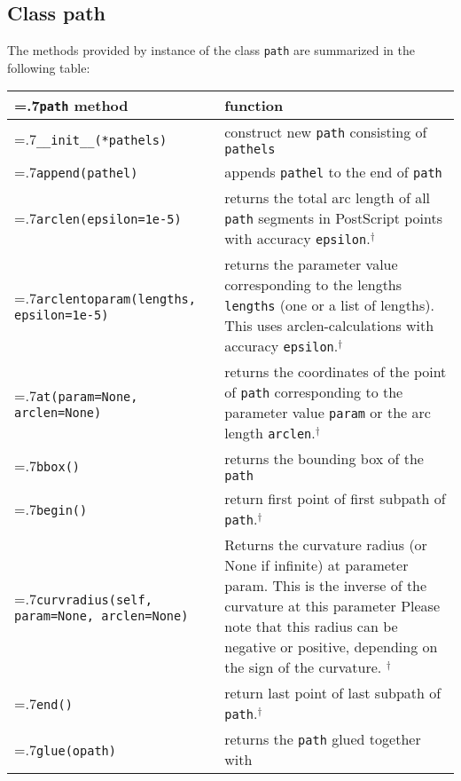 \subsection{Class path}

The methods provided by instance of the class \verb|path| are
summarized in the following table:

\medskip
\begin{tabularx}{1.04\linewidth}{>{\hsize=.7\hsize}X>{\raggedright\arraybackslash\hsize=1.3\hsize}X}
  \texttt{path} method & function \\
  \hline \texttt{\_\_init\_\_(*pathels)} & construct new \texttt{path}
  consisting of \texttt{pathels}\\
  \texttt{append(pathel)} & appends \texttt{pathel} to the end of 
  \texttt{path}\\
  \texttt{arclen(epsilon=1e-5)} & returns the total arc length of
  all \texttt{path} segments in PostScript points with accuracy
  \texttt{epsilon}.$^\dagger$\\
  \texttt{arclentoparam(lengths, \newline\phantom{arclentoparam(}epsilon=1e-5)} & returns the
  parameter value corresponding to the lengths \texttt{lengths} (one or a list of
  lengths). This uses arclen-calculations with accuracy
  \texttt{epsilon}.$^\dagger$\\
  \texttt{at(param=None,
    \newline\phantom{at(}arclen=None)} & returns the coordinates of the point of
  \texttt{path} corresponding to the parameter value
  \texttt{param} or the arc length \verb|arclen|.$^\dagger$\\
  \texttt{bbox()} & returns the bounding box of the \texttt{path}\\
  \texttt{begin()} & return first point of first subpath of
  \texttt{path}.$^\dagger$\\
   \texttt{curvradius(self, 
    \newline\phantom{curvradius(}param=None,
    \newline\phantom{curvradius(}arclen=None)} &
        Returns the curvature radius (or None if infinite) at parameter param.
        This is the inverse of the curvature at this parameter
        Please note that this radius can be negative or positive,
        depending on the sign of the curvature.
        $^\dagger$
        \\
  \texttt{end()} & return last point of last subpath of
  \texttt{path}.$^\dagger$\\
  \texttt{glue(opath)} & returns the \texttt{path} glued together with

\end{tabularx}
